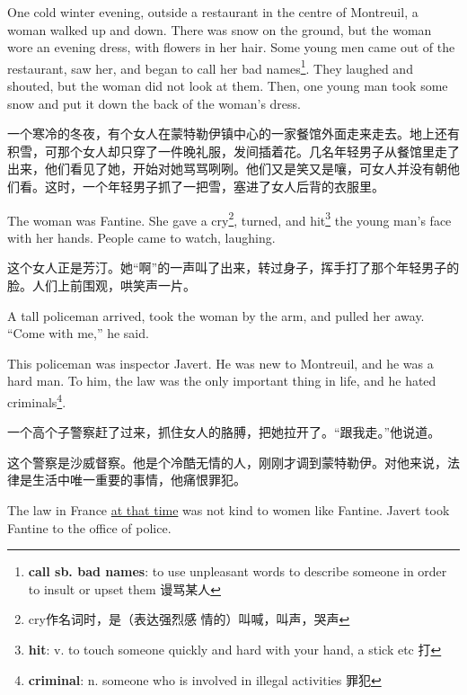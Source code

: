 \documentclass[fontset=ubuntu, zihao=5]{ctexart}
\begin{document}
\begin{paracol}{2}
  \switchcolumn*

  One cold winter evening, outside a restaurant in the centre of Montreuil, a
  woman walked up and down. There was snow on the ground, but the woman wore
  an evening dress, with flowers in her hair. Some young men came out of the
  restaurant, saw her, and began to call her bad names\footnote{\textbf{call
      sb. bad names}: to use unpleasant words to describe someone in order to
    insult or upset them 谩骂某人}. They laughed and shouted, but the woman
  did not look at them. Then, one young man took some snow and put it down the
  back of the woman's dress.

  \switchcolumn

  一个寒冷的冬夜，有个女人在蒙特勒伊镇中心的一家餐馆外面走来走去。地上还有积雪，可那个女人却只穿了一件晚礼服，发间插着花。几名年轻男子从餐馆里走了出来，他们看见了她，开始对她骂骂咧咧。他们又是笑又是嚷，可女人并没有朝他们看。这时，一个年轻男子抓了一把雪，塞进了女人后背的衣服里。

  \switchcolumn*

  The woman was Fantine. She gave a cry\footnote{cry作名词时，是（表达强烈感
    情的）叫喊，叫声，哭声}, turned, and hit\footnote{\textbf{hit}: v. to
    touch someone quickly and hard with your hand, a stick etc 打} the young
  man's face with her hands. People came to watch, laughing.

  \switchcolumn

  这个女人正是芳汀。她“啊”的一声叫了出来，转过身子，挥手打了那个年轻男子的脸。人们上前围观，哄笑声一片。

  \switchcolumn*

  A tall policeman arrived, took the woman by the arm, and pulled her away. ``Come with me,'' he said.


  This policeman was inspector Javert. He was new to Montreuil, and he was a hard man. To him, the law was the only important thing in life, and he hated criminals\footnote{\textbf{criminal}: n. someone who is involved in illegal activities 罪犯}.

  \switchcolumn

  一个高个子警察赶了过来，抓住女人的胳膊，把她拉开了。“跟我走。”他说道。


  这个警察是沙威督察。他是个冷酷无情的人，刚刚才调到蒙特勒伊。对他来说，法律是生活中唯一重要的事情，他痛恨罪犯。

  \switchcolumn*

  The law in France \uline{at that time} was not kind to women like Fantine.
  Javert took Fantine to the office of police.


\end{paracol}
\end{document}
